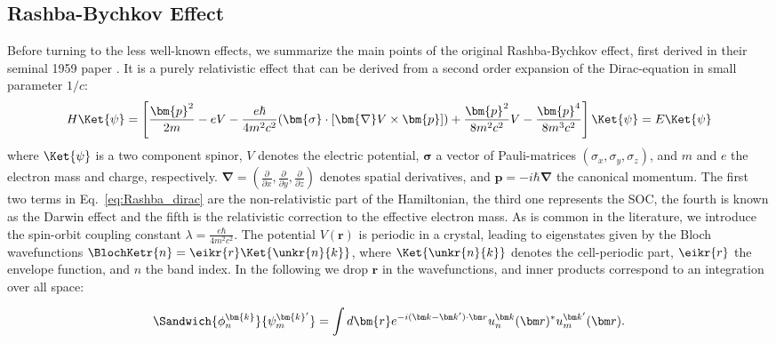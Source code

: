 \subsection{Rashba-Bychkov Effect \label{sec:Rashba_relativistic}}
Before turning to the less well-known effects, we summarize the main points of the original Rashba-Bychkov effect, first derived in their seminal 1959 paper \cite{Rashba1959SymmetryAr}.
It is a purely relativistic effect that can be derived from a second order expansion of the Dirac-equation in small parameter $1/c$:
\begin{equation}
	\label{eq:Rashba_dirac}
	H \Ket{\psi} = \left[\frac{\bm{p}^2}{2m} - e V - \frac{e \hbar}{4m^2c^2}(\bm{\sigma}\cdot[\bm{\nabla}V \times \bm{p}]) + \frac{\bm{p}^2}{8m^2c^2} V - \frac{\bm{p}^4}{8m^3c^2}\right]\Ket{\psi} = E\Ket{\psi}
\end{equation}
where $\Ket{\psi}$ is a two component spinor, $V$ denotes the electric potential, $\bm{\sigma}$ a vector of Pauli-matrices $(\sigma_x, \sigma_y, \sigma_z)$, and $m$ and $e$ the electron mass and charge, respectively.
$\bm \nabla = (\frac{\partial}{\partial x}, \frac{\partial}{\partial y}, \frac{\partial }{\partial z})$ denotes spatial derivatives, and $\bm{p} = -i\hbar \bm{\nabla}$ the canonical momentum.
The first two terms in Eq.~\eqref{eq:Rashba_dirac} are the non-relativistic part of the Hamiltonian, the third one represents the SOC, the fourth is known as the Darwin effect and the fifth is the relativistic correction to the effective electron mass. 
As is common in the literature, we introduce the spin-orbit coupling constant $\lambda = \frac{e \hbar}{4m^2c^2}$.
The potential $V(\bm r)$ is periodic in a crystal, leading to eigenstates given by the Bloch wavefunctions $\BlochKetr{n} = \eikr{r} \Ket{\unkr{n}{k}}$, where $\Ket{\unkr{n}{k}}$ denotes the cell-periodic part, $\eikr{r}$ the envelope function, and $n$ the band index.
In the following we drop $\bm{r}$ in the wavefunctions, and inner products correspond to an integration over all space:

\begin{equation}
	\Sandwich{\phi_n^{\bm{k}}}{\psi_m^{\bm{k}'}} = \int d\bm{r} e^{-i (\bm k - \bm k') \cdot \bm r} u_n^{\bm k }(\bm r)^* u_m^{\bm k'}(\bm r).
\end{equation}

